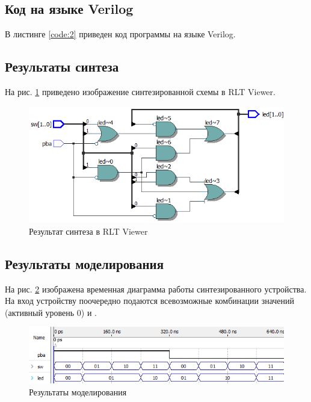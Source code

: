 \subsection{Код на языке Verilog}

В листинге \ref{code:2} приведен код программы на языке Verilog.



\subsection{Результаты синтеза}

На рис. \ref{fig:elab1_2_rtl} приведено изображение синтезированной схемы в RLT Viewer.

\begin{figure}[H]
\begin{center}
	\includegraphics[scale=0.6]{elab1_2_rtl}
	\caption{Результат синтеза в RLT Viewer}
	\label{fig:elab1_2_rtl}
\end{center}
\end{figure}

\subsection{Результаты моделирования}
\label{sec:elab1_2_modeling}

На рис. \ref{fig:elab1_2_modeling} изображена временная диаграмма работы синтезированного устройства. На вход устройству поочередно подаются всевозможные комбинации значений  (активный уровень 0) и .
\begin{figure}[H]
\begin{center}
	\includegraphics[width=\textwidth]{elab1_2_modeling}
	\caption{Результаты моделирования}
	\label{fig:elab1_2_modeling}
\end{center}
\end{figure}

